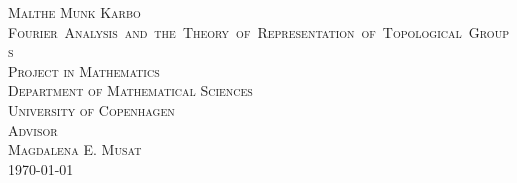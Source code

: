 \clearpage
\thispagestyle{empty}

\begin{titlingpage}
	\vspace*{5.5cm}
	\noindent
	{\large\textsc{Malthe Munk Karbo}}\\[0.5cm]
	{\large\textsc{\mbox{Fourier Analysis and the Theory of Representation of Topological Groups}}}\\[0.1cm]
	\vfill\noindent
	{\large\textsc{Project in Mathematics}}\\[0.2cm]
	\noindent
	{\large\textsc{Department of Mathematical Sciences}}\\[0.2cm]
	\noindent
	{\large\textsc{University of Copenhagen}}\\[1cm]
	{\large\textsc{Advisor \\[0.2cm] {\Large Magdalena E. Musat }}}\\[1cm]
	{\large\textsc{\today}}
	\let\cleardoublepage\clearpage
\end{titlingpage}
\normalfont
\restoregeometry
\cleardoublepage

